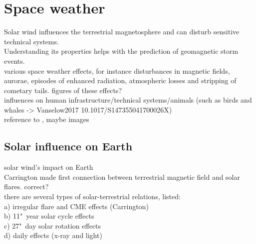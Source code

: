 \section{Space weather}
\label{sec:space_weather}

Solar wind influences the terrestrial magnetosphere and can disturb sensitive technical systems.\\
Understanding its properties helps with the prediction of geomagnetic storm events.\\

various space weather effects, for instance disturbances in magnetic fields, aurorae, episodes of enhanced radiation, atmospheric losses and stripping of cometary tails. figures of these effects?\\

influences on human infrastructure/technical systems/animals (such as birds and whales -> Vanselow2017 10.1017/S147355041700026X)\\

reference to \citet{Bothmer2007}, maybe images\\

\subsection{Solar influence on Earth}
\label{sec:solar_influence_on_earth}

solar wind's impact on Earth\\

Carrington made first connection between terrestrial magnetic field and solar flares. correct?\\

there are several types of solar-terrestrial relations, \citet{Bartels1962} listed:\\	%
a) irregular flare and CME effects (Carrington)\\
b) 11"~year solar cycle effects\\
c) 27"~day solar rotation effects\\
d) daily effects (x-ray and light)\\

